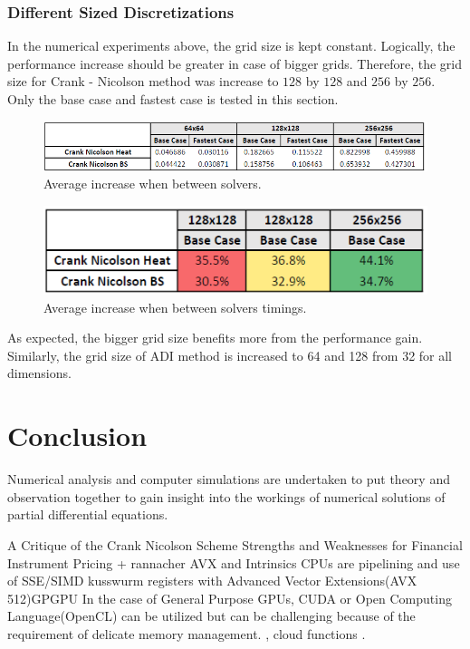 \documentclass[12pt, oneside]{book}
\theoremstyle{plain}
\theoremstyle{definition}
\begin{document}
\subsection{Different Sized Discretizations} 
In the numerical experiments above, the grid size is kept constant. Logically, the performance increase should be greater in case of bigger grids. Therefore, the grid size for Crank - Nicolson method was increase to $128$ by $128$ and $256$ by $256$. Only the base case and fastest case is tested in this section.

 \begin{figure}[!htb]
    \centering
        \includegraphics[scale=0.7]{gridTime.png}
    \caption{Average increase when between solvers.}
\end{figure}

\begin{figure}[!htb]
    \centering
        \includegraphics[scale=0.6]{gridTimePercent.png}
    \caption{Average increase when between solvers timings.}
\end{figure}


As expected, the bigger grid size benefits more from the performance gain. 
Similarly, the grid size of ADI method is increased to 64 and 128 from 32 for all dimensions.



\chapter{Conclusion}

Numerical analysis and computer simulations are undertaken to put theory and observation together to gain insight into the workings of numerical solutions of partial differential equations.

A Critique of the Crank Nicolson Scheme Strengths and Weaknesses for Financial Instrument Pricing + rannacher 
AVX and Intrinsics CPUs are pipelining and use of SSE/SIMD kusswurm registers with Advanced Vector Extensions(AVX 512)GPGPU In the case of General Purpose GPUs, CUDA or Open Computing Language(OpenCL) can be utilized but can be challenging because of the requirement of delicate memory management. \cite{fpga},  cloud functions \cite{cloudfunc}.
\end{document}
